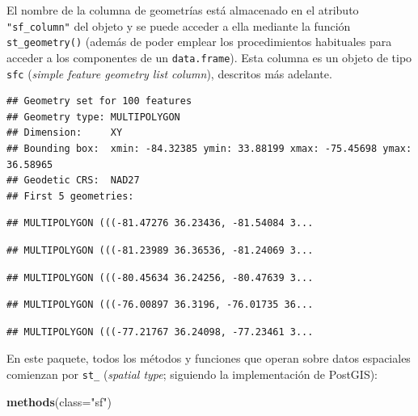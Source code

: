 \documentclass[
]{book}
\newenvironment{Shaded}{\begin{snugshade}}{\end{snugshade}}
\newcommand{\AttributeTok}[1]{\textcolor[rgb]{0.13,0.29,0.53}{#1}}
\newcommand{\CommentTok}[1]{\textcolor[rgb]{0.56,0.35,0.01}{\textit{#1}}}
\newcommand{\FunctionTok}[1]{\textcolor[rgb]{0.13,0.29,0.53}{\textbf{#1}}}
\newcommand{\NormalTok}[1]{#1}
\newcommand{\StringTok}[1]{\textcolor[rgb]{0.31,0.60,0.02}{#1}}
\theoremstyle{break}
\theoremstyle{definition}
\theoremstyle{definition}
\theoremstyle{definition}
\theoremstyle{definition}
\theoremstyle{remark}
\begin{document}
El nombre de la columna de geometrías está almacenado en el atributo \texttt{"sf\_column"} del objeto y se puede acceder a ella mediante la función \texttt{st\_geometry()} (además de poder emplear los procedimientos habituales para acceder a los componentes de un \texttt{data.frame}).
Esta columna es un objeto de tipo \texttt{sfc} (\emph{simple feature geometry list column}), descritos más adelante.

\begin{Shaded}
\end{Shaded}

\begin{verbatim}
## Geometry set for 100 features 
## Geometry type: MULTIPOLYGON
## Dimension:     XY
## Bounding box:  xmin: -84.32385 ymin: 33.88199 xmax: -75.45698 ymax: 36.58965
## Geodetic CRS:  NAD27
## First 5 geometries:
\end{verbatim}

\begin{verbatim}
## MULTIPOLYGON (((-81.47276 36.23436, -81.54084 3...
\end{verbatim}

\begin{verbatim}
## MULTIPOLYGON (((-81.23989 36.36536, -81.24069 3...
\end{verbatim}

\begin{verbatim}
## MULTIPOLYGON (((-80.45634 36.24256, -80.47639 3...
\end{verbatim}

\begin{verbatim}
## MULTIPOLYGON (((-76.00897 36.3196, -76.01735 36...
\end{verbatim}

\begin{verbatim}
## MULTIPOLYGON (((-77.21767 36.24098, -77.23461 3...
\end{verbatim}

En este paquete, todos los métodos y funciones que operan sobre datos espaciales comienzan por \texttt{st\_} (\emph{spatial type}; siguiendo la implementación de PostGIS):

\begin{Shaded}
\begin{Highlighting}[]
\FunctionTok{methods}\NormalTok{(}\AttributeTok{class=}\StringTok{"sf"}\NormalTok{)}
\end{Highlighting}
\end{Shaded}
\end{document}

